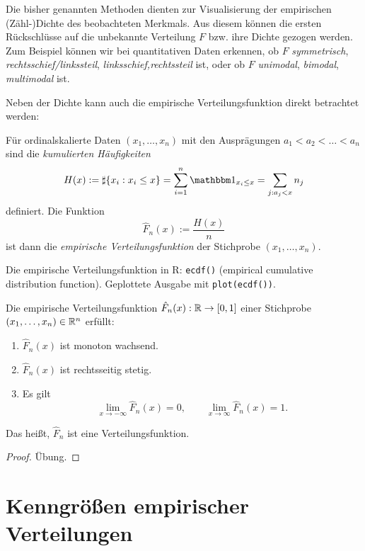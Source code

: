\begin{exmp}[Histogramme in R]
  Die bisher genannten Methoden dienten zur Visualisierung der empirischen
  (Zähl-)Dichte des beobachteten Merkmals. Aus diesem können die ersten
  Rückschlüsse auf die unbekannte Verteilung $F$ bzw. ihre Dichte gezogen
  werden. Zum Beispiel können wir bei quantitativen Daten erkennen, ob $F$
  \emph{symmetrisch}, \emph{rechtsschief/linkssteil},
  \emph{linksschief,rechtssteil} ist, oder ob $F$ \emph{unimodal},
  \emph{bimodal}, \emph{multimodal} ist.
\end{exmp}

Neben der Dichte kann auch die empirische Verteilungsfunktion direkt betrachtet
werden:
\begin{defn}
  Für ordinalskalierte Daten $(x_1, \ldots, x_n)$ mit den Ausprägungen $a_1 <
  a_2 < \ldots < a_n$ sind die \emph{kumulierten Häufigkeiten}
  \[ H(x) := \sharp\{ x_i : x_i \le x \} = \sum_{i=1}^n \ind_{x_i \le x} =
    \sum_{j : a_j < x} n_j \]
  definiert. Die Funktion
  \[ \hat{F}_n(x) := \frac{H(x)}{n} \]
  ist dann die \emph{empirische Verteilungsfunktion} der Stichprobe $(x_1,
  \ldots, x_n)$.
\end{defn}

\begin{exmp}
  Die empirische Verteilungsfunktion in R: \verb+ecdf()+ (empirical cumulative
  distribution function). Geplottete Ausgabe mit \verb+plot(ecdf())+.
\end{exmp}

\begin{prp}
  Die empirische Verteilungsfunktion $\hat{F}_n(x) : \mathbb{R} \to [0,1]$ einer
  Stichprobe $(x_1, \ldots, x_n) \in \mathbb{R}^n$  erfüllt:
  \begin{enumerate}
  \item $\hat{F}_n(x)$ ist monoton wachsend.
  \item $\hat{F}_n(x)$ ist rechtsseitig stetig.
  \item Es gilt
    \[ \lim_{x \to - \infty} \hat{F}_n(x) = 0, \qquad \lim_{x \to \infty}
      \hat{F}_n(x) = 1. \]
  \end{enumerate}
\end{prp}
Das heißt, $\hat{F}_n$ ist eine Verteilungsfunktion.

\begin{proof}
  Übung.
\end{proof}

\section{Kenngrößen empirischer Verteilungen}

